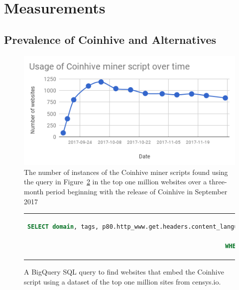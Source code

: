 %
%
%
%
%
%

\section{Measurements}\label{sec:measurements}

\subsection{Prevalence of Coinhive and Alternatives}

\begin{figure}[t]
\centering
\includegraphics[width=\linewidth]{figures/usage_of_coinhive_over_time.png}
\caption[Coinhive Usage Over the First 3 Months]{The number of instances of the Coinhive miner scripts found using the query in Figure~\ref{lst:bigquery} in the top one million websites over a three-month period beginning with the release of Coinhive in September 2017\label{fig:topmil}}
\end{figure}


\begin{figure}[t]
\begin{tabular}{c}
\begin{lstlisting}[breaklines=true,language=sql]
SELECT domain, tags, p80.http_www.get.headers.content_language, p80.http_www.get.headers.server, p80.http.get.headers.x_powered_by, p80.http.get.title, p80.http_www.get.body as wwwbody, p80.http.get.body as plainbody 
FROM censys-io.domain_public.20171123
WHERE STRPOS(p80.http.get.body, coinhive.min.js) > 0 or STRPOS(p80.http_www.get.body, coinhive.min.js) >0)
\end{lstlisting}
\end{tabular}
\caption[BigQuery SQL Query to Find Coinhive Enabled Websites]{A BigQuery SQL query to find websites that embed the Coinhive script using a dataset of the top one million sites from censys.io. \label{lst:bigquery}}
\end{figure}


